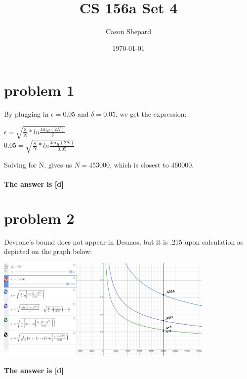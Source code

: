 \documentclass{article}
\title{CS 156a Set 4}
\author{Cason Shepard}
\date\today
\begin{document}
\maketitle

\section*{problem 1}
By plugging in $\epsilon = 0.05$ and $\delta = 0.05$, we get the expression:
\begin{center}
    $\epsilon = \sqrt{\frac{8}{N} * ln\frac{4m_H(2N)}{\delta}}$\\
    $0.05 = \sqrt{\frac{8}{N} * ln\frac{4m_H(2N)}{0.05}}$\\
\end{center}
Solving for N, gives us $N = 453000$, which is closest to 460000.\\\\
\textbf{The answer is [d]}

\section*{problem 2}
Devrone's bound does not appear in Desmos, but it is .215 upon calculation as depicted on the graph below:
\begin{center}
    \includegraphics[width=400]{desmoscs156prob2.jpg}
\end{center}
\textbf{The answer is [d]}
\end{document}
